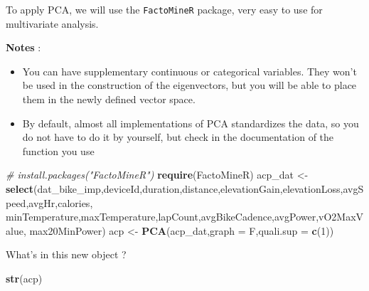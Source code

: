 \documentclass[
]{book}
\newenvironment{Shaded}{\begin{snugshade}}{\end{snugshade}}
\newcommand{\CommentTok}[1]{\textcolor[rgb]{0.56,0.35,0.01}{\textit{#1}}}
\newcommand{\DataTypeTok}[1]{\textcolor[rgb]{0.13,0.29,0.53}{#1}}
\newcommand{\DecValTok}[1]{\textcolor[rgb]{0.00,0.00,0.81}{#1}}
\newcommand{\KeywordTok}[1]{\textcolor[rgb]{0.13,0.29,0.53}{\textbf{#1}}}
\newcommand{\NormalTok}[1]{#1}
\newcommand{\StringTok}[1]{\textcolor[rgb]{0.31,0.60,0.02}{#1}}
\providecommand{\tightlist}{%
  \setlength{\itemsep}{0pt}\setlength{\parskip}{0pt}}
\begin{document}
To apply PCA, we will use the \texttt{FactoMineR} package, very easy to use for multivariate analysis.

\textbf{Notes} :

\begin{itemize}
\tightlist
\item
  You can have supplementary continuous or categorical variables. They won't be used in the construction of the eigenvectors, but you will be able to place them in the newly defined vector space.
\item
  By default, almost all implementations of PCA standardizes the data, so you do not have to do it by yourself, but check in the documentation of the function you use
\end{itemize}

\begin{Shaded}
\begin{Highlighting}[]
\CommentTok{# install.packages("FactoMineR")}
\KeywordTok{require}\NormalTok{(FactoMineR)}
\NormalTok{acp_dat <-}\StringTok{ }\KeywordTok{select}\NormalTok{(dat_bike_imp,deviceId,duration,distance,elevationGain,elevationLoss,avgSpeed,avgHr,calories,}
\NormalTok{              minTemperature,maxTemperature,lapCount,avgBikeCadence,avgPower,vO2MaxValue,}
\NormalTok{              max20MinPower) }
\NormalTok{acp <-}\StringTok{   }\KeywordTok{PCA}\NormalTok{(acp_dat,}\DataTypeTok{graph =}\NormalTok{ F,}\DataTypeTok{quali.sup =} \KeywordTok{c}\NormalTok{(}\DecValTok{1}\NormalTok{))}
\end{Highlighting}
\end{Shaded}

What's in this new object ?

\begin{Shaded}
\begin{Highlighting}[]
\KeywordTok{str}\NormalTok{(acp)}
\end{Highlighting}
\end{Shaded}
\end{document}
